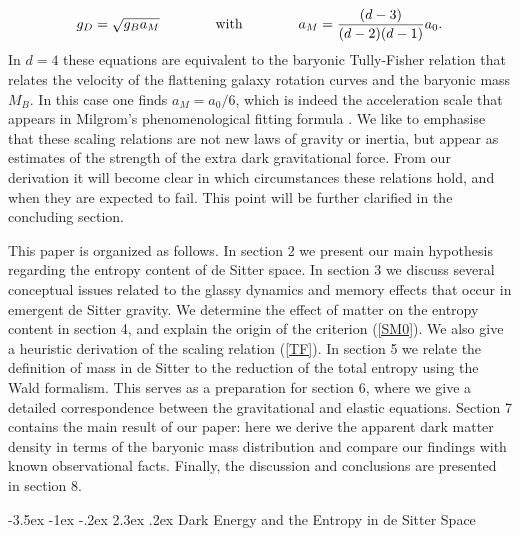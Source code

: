 \documentclass[a4paper,12pt]{article}
\makeatletter
\renewcommand\section{\@startsection {section}{1}{\z@}%
                                   {-3.5ex \@plus -1ex \@minus -.2ex}%
                                   {2.3ex \@plus.2ex}%
                                   {\normalfont\large\bfseries}}
\makeatother
\begin{document}
\begin{equation}
g_{D} = \sqrt{g_{B} a_M} \qquad \qquad \mbox{with}  \qquad \qquad  a_M = {(d-3) \over (d-2)(d-1)} a_0.	
\end{equation}
In $d=4$ these equations are equivalent to the baryonic Tully-Fisher relation \cite{TF-relation} that relates the velocity of the flattening galaxy rotation curves and the baryonic mass $M_B$.  In this case one finds $a_M = a_0/6$, which is indeed the acceleration scale that appears in Milgrom's phenomenological fitting formula \cite{Milgrom,Sanders}.  We like to emphasise that these scaling relations are not  new laws of gravity or inertia, but appear as estimates of the strength of the extra dark gravitational force. From our derivation it will become clear in which circumstances these relations hold, and when they are expected to fail. This point will be further clarified in the concluding section.

This paper is organized as follows. In section 2 we present our main hypothesis regarding the entropy content of de Sitter space. In section 3 we discuss several conceptual issues related to the glassy dynamics and memory effects that occur in emergent de Sitter gravity.  We determine the effect of matter on the entropy content in section 4, and explain the origin of the criterion (\ref{SM0}). We also give a heuristic derivation of the scaling relation (\ref{TF}). In section 5 we relate the definition of mass in de Sitter to the reduction of the total entropy using the Wald formalism. This serves as a preparation for section 6, where we give a detailed correspondence between the gravitational and elastic equations. 
Section 7 contains the main result of our paper: here we derive the apparent dark matter density in terms of the baryonic mass distribution and compare our findings with known observational facts.  Finally, the discussion and conclusions are presented in section 8.  



 
 
 


\newpage

\section{Dark Energy and the Entropy in de Sitter Space}

\label{sec:darkenergyandentropy}
\end{document}
